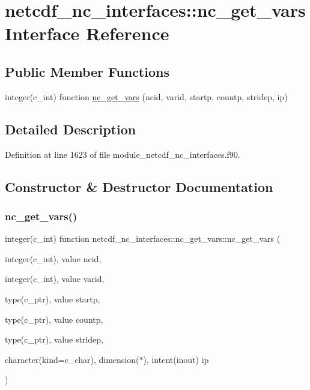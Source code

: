 \hypertarget{interfacenetcdf__nc__interfaces_1_1nc__get__vars}{}\section{netcdf\+\_\+nc\+\_\+interfaces\+:\+:nc\+\_\+get\+\_\+vars Interface Reference}
\label{interfacenetcdf__nc__interfaces_1_1nc__get__vars}
\subsection*{Public Member Functions}
\begin{DoxyCompactItemize}
\item 
integer(c\+\_\+int) function \hyperlink{interfacenetcdf__nc__interfaces_1_1nc__get__vars_a38a700c9cf1113f3ca7338c39496fa3d}{nc\+\_\+get\+\_\+vars} (ncid, varid, startp, countp, stridep, ip)
\end{DoxyCompactItemize}


\subsection{Detailed Description}


Definition at line 1623 of file module\+\_\+netcdf\+\_\+nc\+\_\+interfaces.\+f90.



\subsection{Constructor \& Destructor Documentation}
\mbox{\label{interfacenetcdf__nc__interfaces_1_1nc__get__vars_a38a700c9cf1113f3ca7338c39496fa3d}} 
\subsubsection{\texorpdfstring{nc\+\_\+get\+\_\+vars()}{nc\_get\_vars()}}
{\footnotesize\ttfamily integer(c\+\_\+int) function netcdf\+\_\+nc\+\_\+interfaces\+::nc\+\_\+get\+\_\+vars\+::nc\+\_\+get\+\_\+vars (\begin{DoxyParamCaption}\item[{integer(c\+\_\+int), value}]{ncid,  }\item[{integer(c\+\_\+int), value}]{varid,  }\item[{type(c\+\_\+ptr), value}]{startp,  }\item[{type(c\+\_\+ptr), value}]{countp,  }\item[{type(c\+\_\+ptr), value}]{stridep,  }\item[{character(kind=c\+\_\+char), dimension($\ast$), intent(inout)}]{ip }\end{DoxyParamCaption})}



